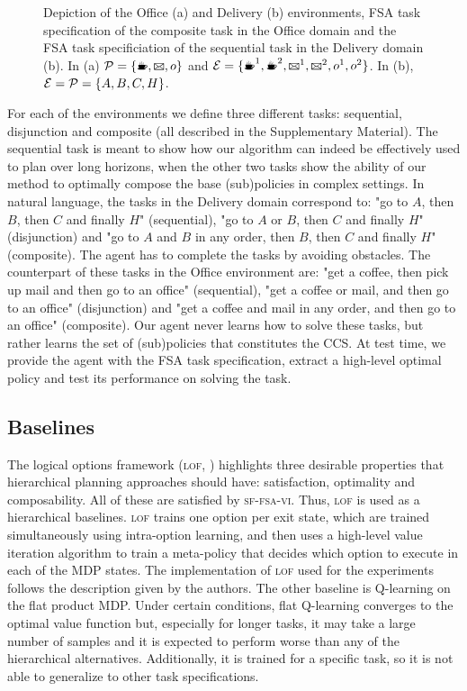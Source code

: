 \begin{figure}[!tb]
    \centering
    
  \caption{Depiction of the Office (a) and Delivery (b) environments, FSA task specification of the composite task in the Office domain and the FSA task specificiation of the sequential task in the Delivery domain (b). In (a) $\cP=\{\text{\coffee}, \text{\mail}, o\}$ and $\cE=\{\text{\coffee}^1,\text{\coffee}^2, \text{\mail}^1,\text{\mail}^2, o^1, o^2\}$. In (b), $\mathcal{E}=\mathcal{P}=\{A, B, C, H\}$.}
 \label{fig:delivery}
\end{figure}

For each of the environments we define three different tasks: sequential, disjunction and composite (all described in the Supplementary Material). The sequential task is meant to show how our algorithm can indeed be effectively used to plan over long horizons, when the other two tasks show the ability of our method to optimally compose the base (sub)policies in complex settings. In natural language, the tasks in the Delivery domain correspond to: "go to $A$, then $B$, then $C$ and finally $H$"  (sequential), "go to $A$ or $B$, then $C$ and finally $H$" (disjunction) and "go to $A$ and $B$ in any order, then $B$, then $C$ and finally $H$" (composite). The agent has to complete the tasks by avoiding obstacles. The counterpart of these tasks in the Office environment are: "get a coffee, then pick up mail and then go to an office" (sequential), "get a coffee or mail, and then go to an office" (disjunction) and "get a coffee and mail in any order, and then go to an office" (composite). 
Our agent never learns how to solve these tasks, but rather learns the set of (sub)policies that constitutes the CCS. At test time, we provide the agent with the FSA task specification, extract a high-level optimal policy and test its performance on solving the task.

\subsection{Baselines} The logical options framework (\textsc{lof}, \citet{Araki2021}) highlights three desirable properties that hierarchical planning approaches should have: satisfaction, optimality and composability. All of these are satisfied by \textsc{sf-fsa-vi}. Thus, \textsc{lof} is used as a hierarchical baselines. \textsc{\textsc{lof}} trains one option per exit state, which are trained simultaneously using intra-option learning, and then uses a high-level value iteration algorithm to train a meta-policy that decides which option to execute in each of the MDP states. The implementation of \textsc{lof} used for the experiments follows the description given by the authors. The other baseline is Q-learning on the flat product MDP. Under certain conditions, flat Q-learning converges to the optimal value function but, especially for longer tasks, it may take a large number of samples and it is expected to perform worse than any of the hierarchical alternatives. Additionally, it is trained for a specific task, so it is not able to generalize to other task specifications. 

